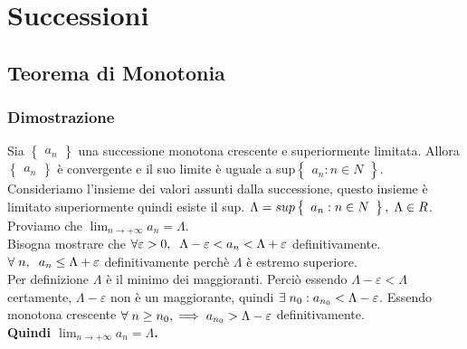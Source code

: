 \documentclass[11pt, a4paper]{article}
\begin{document}
\newpage

\section{Successioni}
\subsection{Teorema di Monotonia}
\subsubsection*{Dimostrazione}
Sia $\left\{
\begin{array}{l}
a_n
\end{array}
\right\}
$ una successione monotona crescente e superiormente limitata. Allora $\left\{\begin{array}{l}a_n\end{array}\right\}$ è convergente e il suo limite è uguale a sup$\left\{\begin{array}{l}a_n : n \in N \end{array}\right\}$.\\
Consideriamo l'insieme dei valori assunti dalla successione, questo insieme è limitato superiormente quindi esiste il sup. $\Lambda=sup\left\{\begin{array}{l}a_n : n \in N \end{array}\right\}, \hspace{0.1cm} \Lambda \in R$.\\
Proviamo che $\lim_{n\to+\infty}a_n=\Lambda$.\\ Bisogna mostrare che $\forall\varepsilon>0, \hspace{0.2cm} \Lambda-\varepsilon<a_n<\Lambda+\varepsilon$ definitivamente.\\
$\forall\hspace{0.1cm} n, \hspace{0.2cm} a_n\leq\Lambda+\varepsilon$ definitivamente perchè $\Lambda$ è estremo superiore.\\
Per definizione $\Lambda$ è il minimo dei maggioranti. Perciò essendo $\Lambda-\varepsilon<\Lambda$ certamente, $\Lambda-\varepsilon$ non è un maggiorante, quindi $\exists\hspace{0.1cm}n_0 : a_{n_0}<\Lambda-\varepsilon$. Essendo monotona crescente $\forall\hspace{0.1cm}n\geq n_0, \hspace{0.1cm}\Longrightarrow\hspace{0.1cm}a_{n_0}>\Lambda-\varepsilon$ definitivamente.\\
\textbf{Quindi $\lim_{n\to+\infty}a_n=\Lambda$.}
\end{document}
